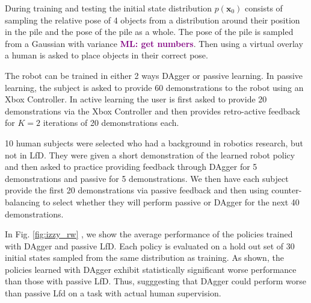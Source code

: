 \documentclass[10pt, conference]{ieeeconf}      %
\newcommand{\bx}{\mathbf{x}}
\newcommand{\mlnote}[1]{\ifthenelse{ \boolean{include-notes}}%
 {\textcolor{purple}{\textbf{ML: #1}}}{}}
\begin{document}
During training and testing the initial state distribution $p(\bx_0)$ consists of sampling the relative pose of 4 objects from a distribution around their position in the pile and the pose of the pile as a whole. The pose of the pile is sampled from a Gaussian with variance \mlnote{get numbers}. Then using a virtual overlay a human is asked to place objects in their correct pose. 

The robot can be trained in either 2 ways DAgger or passive learning. In passive learning, the subject is asked to provide 60 demonstrations to the robot using an Xbox Controller. In active learning the user is first asked to provide 20 demonstrations via the Xbox Controller and then provides retro-active feedback for $K=2$ iterations of 20 demonstrations each. 

10 human subjects were selected who had a background in robotics research, but not in LfD. They were given a short demonstration of the learned robot policy and then asked to practice providing feedback through DAgger for 5 demonstrations and passive for 5 demonstrations. We then have each subject provide the first 20 demonstrations via passive feedback and then using counter-balancing to select whether they will perform passive or DAgger for the next 40 demonstrations.  

In Fig. \ref{fig:izzy_rw} , we show the average performance of the policies trained with DAgger and passive LfD. Each policy is evaluated on a hold out set of 30 initial states sampled from the same distribution as training. As shown, the policies learned with DAgger exhibit statistically significant worse performance than those with passive LfD. Thus, sugggesting that DAgger could perform worse than passive Lfd on a task with actual human supervision. 
\end{document}
